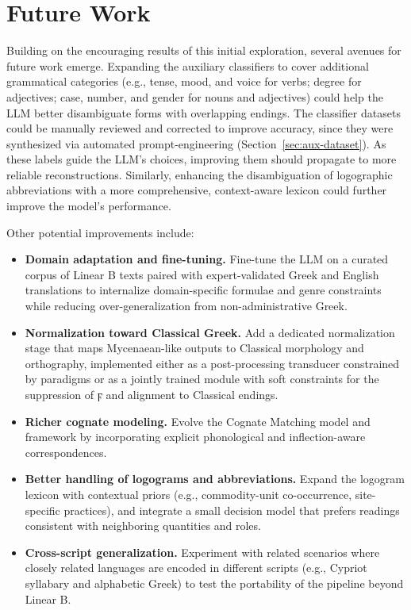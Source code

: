 \section{Future Work}

Building on the encouraging results of this initial exploration, several avenues for future work emerge.
Expanding the auxiliary classifiers to cover additional grammatical categories (e.g., tense, mood, and voice for verbs; degree for adjectives; case, number, and gender for nouns and adjectives) could help the LLM better disambiguate forms with overlapping endings.
The classifier datasets could be manually reviewed and corrected to improve accuracy, since they were synthesized via automated prompt-engineering (Section~\ref{sec:aux-dataset}).
As these labels guide the LLM's choices, improving them should propagate to more reliable reconstructions.
Similarly, enhancing the disambiguation of logographic abbreviations with a more comprehensive, context-aware lexicon could further improve the model's performance.

Other potential improvements include:
\begin{itemize}
\item \textbf{Domain adaptation and fine-tuning.} Fine-tune the LLM on a curated corpus of Linear B texts paired with expert-validated Greek and English translations to internalize domain-specific formulae and genre constraints while reducing over-generalization from non-administrative Greek.

\item \textbf{Normalization toward Classical Greek.} Add a dedicated normalization stage that maps Mycenaean-like outputs to Classical morphology and orthography, implemented either as a post-processing transducer constrained by paradigms or as a jointly trained module with soft constraints for the suppression of \textgreek{ϝ} and alignment to Classical endings.  

\item \textbf{Richer cognate modeling.} Evolve the Cognate Matching model and framework by incorporating explicit phonological and inflection-aware correspondences.

\item \textbf{Better handling of logograms and abbreviations.} Expand the logogram lexicon with contextual priors (e.g., commodity-unit co-occurrence, site-specific practices), and integrate a small decision model that prefers readings consistent with neighboring quantities and roles.  

\item \textbf{Cross-script generalization.} Experiment with related scenarios where closely related languages are encoded in different scripts (e.g., Cypriot syllabary and alphabetic Greek) to test the portability of the pipeline beyond Linear B.  
\end{itemize}

